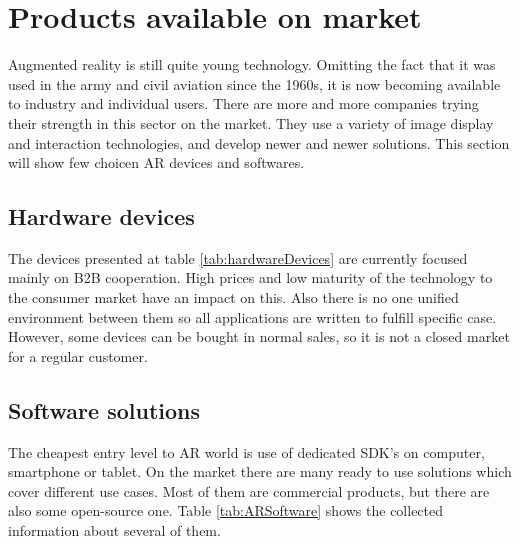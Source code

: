 \documentclass[printmode,en]{mgr}
\begin{document}
\section{Products available on market}
Augmented reality is still quite young technology. Omitting the fact that it was used in the army and civil aviation since the 1960s, it is now becoming available to industry and individual users. There are more and more companies trying their strength in this sector on the market. They use a variety of image display and interaction technologies, and develop newer and newer solutions. This section will show few choicen AR devices and softwares.

\subsection{Hardware devices}
The devices presented at table \ref{tab:hardwareDevices} are currently focused mainly on B2B cooperation. High prices and low maturity of the technology to the consumer market have an impact on this. Also there is no one unified environment between them so all applications are written to fulfill specific case. However, some devices can be bought in normal sales, so it is not a closed market for a regular customer.

\subsection{Software solutions}
The cheapest entry level to AR world is use of dedicated SDK's on computer, smartphone or tablet. On the market there are many ready to use solutions which cover different use cases. Most of them are commercial products, but there are also some open-source one. Table \ref{tab:ARSoftware} shows the collected information about several of them.

\end{document}
